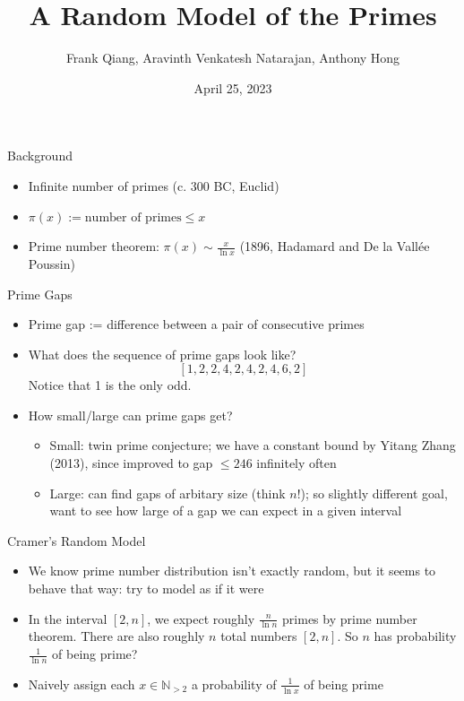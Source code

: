 \documentclass{beamer}
\title{A Random Model of the Primes}
\author{Frank Qiang, Aravinth Venkatesh Natarajan, Anthony Hong}
\institute{Georgia Institute of Technology}
\date{April 25, 2023}
\begin{document}
\frame{\titlepage}
\begin{frame}{Background}
  \begin{itemize}
    \item Infinite number of primes (c. 300 BC, Euclid)
    \item $\pi(x) := \text{number of primes} \leq x$
    \item Prime number theorem: $\pi(x) \sim \frac{x}{\ln x}$ (1896, Hadamard and De la Vall\'ee Poussin)
  \end{itemize}
\end{frame}

\begin{frame}{Prime Gaps}
  \begin{itemize}
    \item Prime gap := difference between a pair of consecutive primes
    \item What does the sequence of prime gaps look like?
      \[[1,2,2,4,2,4,2,4,6,2]\]
      Notice that 1 is the only odd.
    \item How small/large can prime gaps get?
    \begin{itemize}
      \item Small: twin prime conjecture; we have a constant bound by Yitang Zhang (2013), since improved to gap
        $\le 246$ infinitely often
      \item Large: can find gaps of arbitary size (think $n!$); so slightly different goal, want to see how large of a gap we can expect in a given interval
    \end{itemize}
  \end{itemize}
\end{frame}

\begin{frame}{Cramer's Random Model}
  \begin{itemize}
    \item We know prime number distribution isn't exactly random, but it seems to behave that way: try to model as if it were
    \item In the interval $[2, n]$, we expect roughly $\frac{n}{\ln n}$ primes by prime number theorem. There are also roughly $n$ total numbers $[2, n]$. So $n$ has probability $\frac{1}{\ln n}$ of being prime?
    \item Naively assign each $x \in \mathbb{N}_{>2}$ a probability of $\frac{1}{\ln x}$ of being prime
  \end{itemize}
\end{frame}
\end{document}
